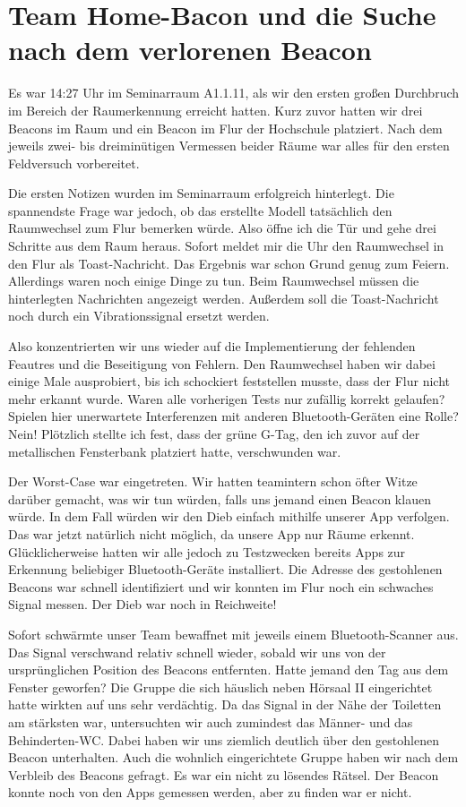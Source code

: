 \section{Team Home-Bacon und die Suche nach dem verlorenen Beacon}

Es war 14:27 Uhr im Seminarraum A1.1.11, als wir den ersten großen Durchbruch
im Bereich der Raumerkennung erreicht hatten. Kurz zuvor hatten wir drei Beacons
im Raum und ein Beacon im Flur der Hochschule platziert. Nach dem jeweils
zwei- bis dreiminütigen Vermessen beider Räume war alles für den ersten
Feldversuch vorbereitet.

Die ersten Notizen wurden im Seminarraum erfolgreich hinterlegt. Die spannendste
Frage war jedoch, ob das erstellte Modell tatsächlich den Raumwechsel zum Flur 
bemerken würde. Also öffne ich die Tür und gehe drei Schritte aus dem Raum heraus.
Sofort meldet mir die Uhr den Raumwechsel in den Flur als Toast-Nachricht. Das 
Ergebnis war schon Grund genug zum Feiern. Allerdings waren noch einige Dinge
zu tun. Beim Raumwechsel müssen die hinterlegten Nachrichten angezeigt werden.
Außerdem soll die Toast-Nachricht noch durch ein Vibrationssignal ersetzt werden.

Also konzentrierten wir uns wieder auf die Implementierung der fehlenden
Feautres und die Beseitigung von Fehlern. Den Raumwechsel haben wir dabei einige
Male ausprobiert, bis ich schockiert feststellen musste, dass der Flur nicht
mehr erkannt wurde. Waren alle vorherigen Tests nur zufällig korrekt gelaufen?
Spielen hier unerwartete Interferenzen mit anderen Bluetooth-Geräten eine Rolle?
Nein! Plötzlich stellte ich fest, dass der grüne G-Tag, den ich zuvor auf der
metallischen Fensterbank platziert hatte, verschwunden war.

Der Worst-Case war eingetreten. Wir hatten teamintern schon öfter Witze darüber
gemacht, was wir tun würden, falls uns jemand einen Beacon klauen würde.
In dem Fall würden wir den Dieb einfach mithilfe unserer App verfolgen.
Das war jetzt natürlich nicht möglich, da unsere App nur Räume erkennt.
Glücklicherweise hatten wir alle jedoch zu Testzwecken bereits Apps zur Erkennung
beliebiger Bluetooth-Geräte installiert. Die Adresse des gestohlenen Beacons
war schnell identifiziert und wir konnten im Flur noch ein schwaches Signal
messen. Der Dieb war noch in Reichweite!

Sofort schwärmte unser Team bewaffnet mit jeweils einem Bluetooth-Scanner aus.
Das Signal verschwand relativ schnell wieder, sobald wir uns von der ursprünglichen
Position des Beacons entfernten. Hatte jemand den Tag aus dem Fenster geworfen?
Die Gruppe die sich häuslich neben Hörsaal II eingerichtet hatte wirkten auf uns
sehr verdächtig. Da das Signal in der Nähe der Toiletten am stärksten war,
untersuchten wir auch zumindest das Männer- und das Behinderten-WC. Dabei haben wir
uns ziemlich deutlich über den gestohlenen Beacon unterhalten. Auch die
wohnlich eingerichtete Gruppe haben wir nach dem Verbleib des Beacons gefragt.
Es war ein nicht zu lösendes Rätsel. Der Beacon konnte noch von den Apps gemessen
werden, aber zu finden war er nicht.

